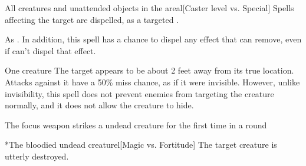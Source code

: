 \begin{spellheader}
\end{spellheader}
\begin{spelleffects}
    \begin{spelltargets}{All creatures and unattended objects in the area}l[Caster level vs. Special]
        \spelleffect Spells affecting the target are dispelled, as a targeted .
    \end{spelltargets}
\end{spelleffects}
\begin{spellfooter}
    \spellnotes As . In addition, this spell has a chance to dispel any effect that  can remove, even if  can't dispel that effect.
\end{spellfooter}

\begin{spellheader}
    \spellrng{\rngclose}
    \spelldur{\durshort \dismissable}
\end{spellheader}
\begin{spelleffects}
    \begin{spelltarget}{One creature}
        \spelleffect The target appears to be about 2 feet away from its true location. Attacks against it have a 50\% miss chance, as if it were invisible. However, unlike invisibility, this spell does not prevent enemies from targeting the creature normally, and it does not allow the creature to hide.
    \end{spelltarget}
\end{spelleffects}

\begin{spellheader}
    \spellrng{\rngclose}
    \spelldur{\durshort}
\end{spellheader}
\begin{spelltrigger}{The focus weapon strikes a \bloodied undead creature for the first time in a round}
    \begin{spelltarget}*{The bloodied undead creature}l[Magic vs. Fortitude]
        \spellsuccess The target creature is utterly destroyed.
    \end{spelltarget}
\end{spelltrigger}


